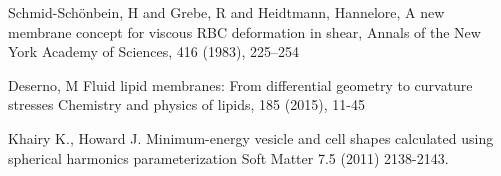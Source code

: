 \begin{thebibliography}{9}
  
  Schmid-Sch{\"o}nbein, H and Grebe, R and Heidtmann, Hannelore,
  A new membrane concept for viscous RBC deformation in shear,
  Annals of the New York Academy of Sciences, 416 (1983), 225--254
  
  Deserno, M
  Fluid lipid membranes: From differential geometry to curvature stresses
  Chemistry and physics of lipids, 185 (2015), 11-45

  Khairy K., Howard J.
  Minimum-energy vesicle and cell shapes calculated using spherical harmonics parameterization
  Soft Matter 7.5 (2011) 2138-2143.  
  
\end{thebibliography}
